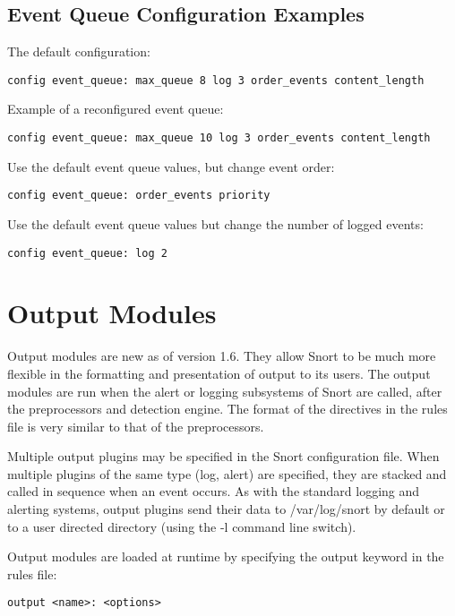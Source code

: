 \documentclass[english]{report}
\begin{document}
\subsection{Event Queue Configuration Examples}

The default configuration:
\begin{verbatim}
config event_queue: max_queue 8 log 3 order_events content_length
\end{verbatim}

Example of a reconfigured event queue:
\begin{verbatim}
config event_queue: max_queue 10 log 3 order_events content_length
\end{verbatim}

Use the default event queue values, but change event order:
\begin{verbatim}
config event_queue: order_events priority
\end{verbatim}

Use the default event queue values but change the number of logged events:
\begin{verbatim}
config event_queue: log 2
\end{verbatim}

\section{Output Modules}

Output modules are new as of version 1.6. They allow Snort to be much
more flexible in the formatting and presentation of output to its
users. The output modules are run when the alert or logging subsystems
of Snort are called, after the preprocessors and detection engine.
The format of the directives in the rules file is very similar to
that of the preprocessors.

Multiple output plugins may be specified in the Snort configuration
file. When multiple plugins of the same type (log, alert) are specified,
they are stacked and called in sequence when an
event occurs. As with the standard logging and alerting systems, output
plugins send their data to /var/log/snort by default or to a user
directed directory (using the -l command line
switch).

Output modules are loaded at runtime by specifying the output keyword
in the rules file:

\begin{verbatim}
output <name>: <options>
\end{verbatim}
\end{document}
